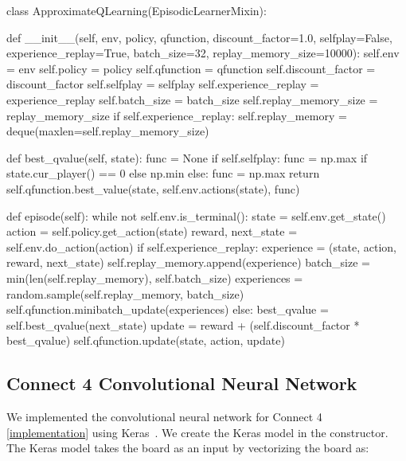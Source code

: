\documentclass{article}
\newcommand{\GithubURL}[1]{[\href{https://github.com/davidrobles/mlnd-capstone-code/blob/master/#1}{implementation}]}
\begin{document}
\begin{python}
class ApproximateQLearning(EpisodicLearnerMixin):

    def __init__(self, env, policy, qfunction, discount_factor=1.0, selfplay=False,
                 experience_replay=True, batch_size=32, replay_memory_size=10000):
        self.env = env
        self.policy = policy
        self.qfunction = qfunction
        self.discount_factor = discount_factor
        self.selfplay = selfplay
        self.experience_replay = experience_replay
        self.batch_size = batch_size
        self.replay_memory_size = replay_memory_size
        if self.experience_replay:
            self.replay_memory = deque(maxlen=self.replay_memory_size)

    def best_qvalue(self, state):
        func = None
        if self.selfplay:
            func = np.max if state.cur_player() == 0 else np.min
        else:
            func = np.max
        return self.qfunction.best_value(state, self.env.actions(state), func)

    def episode(self):
        while not self.env.is_terminal():
            state = self.env.get_state()
            action = self.policy.get_action(state)
            reward, next_state = self.env.do_action(action)
            if self.experience_replay:
                experience = (state, action, reward, next_state)
                self.replay_memory.append(experience)
                batch_size = min(len(self.replay_memory), self.batch_size)
                experiences = random.sample(self.replay_memory, batch_size)
                self.qfunction.minibatch_update(experiences)
            else:
                best_qvalue = self.best_qvalue(next_state)
                update = reward + (self.discount_factor * best_qvalue)
                self.qfunction.update(state, action, update)
\end{python}

\subsection{Connect 4 Convolutional Neural Network}

We implemented the convolutional neural network for Connect 4
\GithubURL{capstone/rl/value_functions/c4deepnetwork.py\#L42} using Keras~\citep{chollet2015keras}.
We create the Keras model in the constructor.  The Keras model takes the board as an input by
vectorizing the board as:
\end{document}
